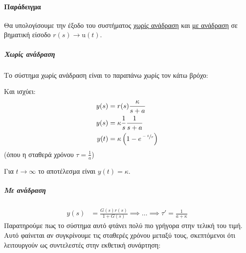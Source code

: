\documentclass[11pt,a4paper,notitlepage,fleqn,final]{article}
\begin{document}
\paragraph{Παράδειγμα} \hspace{0pt}


Θα υπολογίσουμε την έξοδο του συστήματος \underline{χωρίς ανάδραση} και \underline{με ανάδραση} σε βηματική είσοδο \( r(s) \rightarrow \mathrm u(t) \).
\subparagraph{Χωρίς ανάδραση} \hspace{0pt}

Το σύστημα χωρίς ανάδραση είναι το παραπάνω χωρίς τον κάτω βρόχο:

Και ισχύει:
\begin{align*}
	y(s) &= r(s)\frac{\kappa}{s+a} \\
	y(s) &= \kappa\frac{1}{s}\frac{1}{s+a} \\
	y(t) &= \kappa\left( 1-e^{\sfrac{-t}{\tau}} \right)
\end{align*}
(όπου η σταθερά χρόνου \( \tau = \frac{1}{a} \))

Για \( t\to \infty \) το αποτέλεσμα είναι \( y(t) = \kappa \).

\subparagraph{Με ανάδραση}
\begin{align*}
	y(s) &= \frac{G(s)r(s)}{1+G(s)} \implies \dots \implies
	\tau' = \frac{1}{a+\kappa}
\end{align*}
Παρατηρούμε πως το σύστημα αυτό φτάνει πολύ πιο γρήγορα στην τελική του τιμή. Αυτό φαίνεται
αν συγκρίνουμε τις σταθερές χρόνου μεταξύ τους, σκεπτόμενοι ότι λειτουργούν ως συντελεστές
στην εκθετική συνάρτηση:
\end{document}
